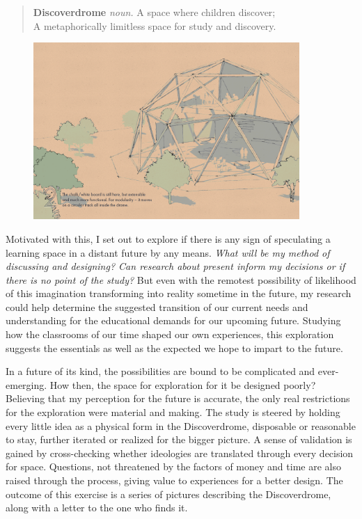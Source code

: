 \documentclass[a4paper,7pt]{article}
\begin{document}
\begin{quote}
	\textbf{Discoverdrome} \textit{noun.} A space where children discover; \\A metaphorically limitless space for study and discovery.
\end{quote}

\begin{figure}[h]
  \center
  \includegraphics[width=0.9\textwidth]{discoverdrome_2.png}
\end{figure}

Motivated with this, I set out to explore if there is any sign of speculating a learning space in a distant future by any means. \textit{What will be my method of discussing and designing? Can research about present inform my decisions or if there is no point of the study?} But even with the remotest possibility of likelihood of this imagination transforming into reality sometime in the future, my research could help determine the suggested transition of our current needs and understanding for the educational demands for our upcoming future. Studying how the classrooms of our time shaped our own experiences, this exploration suggests the essentials as well as the expected we hope to impart to the future. 

In a future of its kind, the possibilities are bound to be complicated and ever-emerging. How then, the space for exploration for it be designed poorly? Believing that my perception for the future is accurate, the only real restrictions for the exploration were material and making. The study is steered by holding every little idea as a physical form in the Discoverdrome, disposable or reasonable to stay, further iterated or realized for the bigger picture. A sense of validation is gained by cross-checking whether ideologies are translated through every decision for space. Questions, not threatened by the factors of money and time are also raised through the process, giving value to experiences for a better design. The outcome of this exercise is a series of pictures describing the Discoverdrome, along with a letter to the one who finds it.
\end{document}

